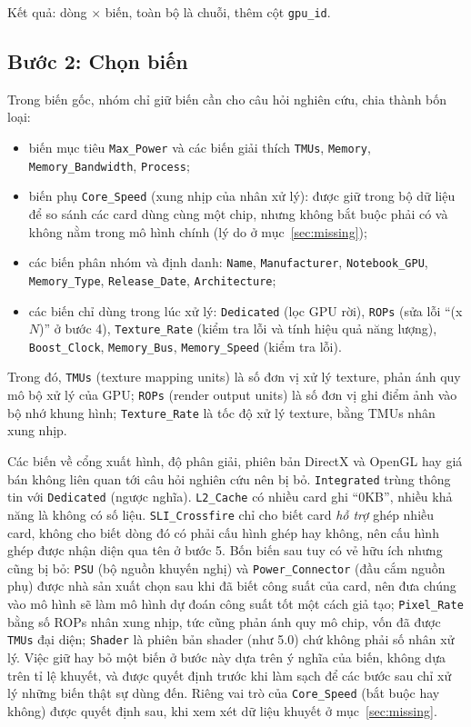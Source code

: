 Kết quả: \PreRowsRaw{} dòng $\times$ \PreColsRaw{} biến, toàn bộ là chuỗi, thêm cột
\texttt{gpu\_id}.

\subsection{Bước 2: Chọn biến}

Trong \PreColsRaw{} biến gốc, nhóm chỉ giữ \PreColsSelected{} biến cần cho câu hỏi nghiên
cứu, chia thành bốn loại:
{\sloppy
\begin{itemize}
  \item biến mục tiêu \texttt{Max\_Power} và các biến giải thích \texttt{TMUs},
    \texttt{Memory}, \texttt{Memory\_Bandwidth}, \texttt{Process};
  \item biến phụ \texttt{Core\_Speed} (xung nhịp của nhân xử lý): được giữ trong bộ dữ
    liệu để so sánh các card dùng cùng một chip, nhưng không bắt buộc phải có và không nằm
    trong mô hình chính (lý do ở mục~\ref{sec:missing});
  \item các biến phân nhóm và định danh: \texttt{Name}, \texttt{Manufacturer},
    \texttt{Notebook\_GPU}, \texttt{Memory\_Type}, \texttt{Release\_Date},
    \texttt{Architecture};
  \item các biến chỉ dùng trong lúc xử lý: \texttt{Dedicated} (lọc GPU rời),
    \texttt{ROPs} (sửa lỗi ``(x$N$)'' ở bước 4), \texttt{Texture\_Rate} (kiểm tra lỗi và
    tính hiệu quả năng lượng), \texttt{Boost\_Clock}, \texttt{Memory\_Bus},
    \texttt{Memory\_Speed} (kiểm tra lỗi).
\end{itemize}
\par}
Trong đó, \texttt{TMUs} (texture mapping units) là số đơn vị xử lý texture, phản ánh quy
mô bộ xử lý của GPU; \texttt{ROPs} (render output units) là số đơn vị ghi điểm ảnh vào bộ
nhớ khung hình; \texttt{Texture\_Rate} là tốc độ xử lý texture, bằng TMUs nhân xung nhịp.

Các biến về cổng xuất hình, độ phân giải, phiên bản DirectX và OpenGL hay giá bán không
liên quan tới câu hỏi nghiên cứu nên bị bỏ. \texttt{Integrated} trùng thông tin với
\texttt{Dedicated} (ngược nghĩa). \texttt{L2\_Cache} có nhiều card ghi ``0KB'', nhiều khả
năng là không có số liệu. \texttt{SLI\_Crossfire} chỉ cho biết card \emph{hỗ trợ} ghép
nhiều card, không cho biết dòng đó có phải cấu hình ghép hay không, nên cấu hình ghép được
nhận diện qua tên ở bước 5. Bốn biến sau tuy có vẻ hữu ích nhưng cũng bị bỏ:
\texttt{PSU} (bộ nguồn khuyến nghị) và \texttt{Power\_Connector} (đầu cắm nguồn phụ) được
nhà sản xuất chọn sau khi đã biết công suất của card, nên đưa chúng vào mô hình sẽ làm mô
hình dự đoán công suất tốt một cách giả tạo; \texttt{Pixel\_Rate} bằng số ROPs nhân xung
nhịp, tức cũng phản ánh quy mô chip, vốn đã được \texttt{TMUs} đại diện;
\texttt{Shader} là phiên bản shader (như 5.0) chứ không phải số nhân
xử lý. Việc giữ hay bỏ một biến ở bước này dựa trên ý nghĩa của biến, không dựa trên tỉ lệ
khuyết, và được quyết định trước khi làm sạch để các bước sau chỉ xử lý những biến thật sự
dùng đến. Riêng vai trò của \texttt{Core\_Speed} (bắt buộc hay không) được quyết định
sau, khi xem xét dữ liệu khuyết ở mục~\ref{sec:missing}.

